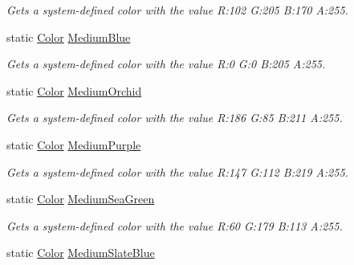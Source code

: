\begin{DoxyCompactItemize}
\begin{DoxyCompactList}\small\item\em Gets a system-\/defined color with the value R\+:102 G\+:205 B\+:170 A\+:255.\end{DoxyCompactList}\item 
static \hyperlink{structMicrosoft_1_1Xna_1_1Framework_1_1Color}{Color} \hyperlink{structMicrosoft_1_1Xna_1_1Framework_1_1Color_af1d6d462b2b790c1db7fa4eea1c2192e}{Medium\+Blue}
\begin{DoxyCompactList}\small\item\em Gets a system-\/defined color with the value R\+:0 G\+:0 B\+:205 A\+:255.\end{DoxyCompactList}\item 
static \hyperlink{structMicrosoft_1_1Xna_1_1Framework_1_1Color}{Color} \hyperlink{structMicrosoft_1_1Xna_1_1Framework_1_1Color_a8988833e0d78a5f1c388744b435bfa93}{Medium\+Orchid}
\begin{DoxyCompactList}\small\item\em Gets a system-\/defined color with the value R\+:186 G\+:85 B\+:211 A\+:255.\end{DoxyCompactList}\item 
static \hyperlink{structMicrosoft_1_1Xna_1_1Framework_1_1Color}{Color} \hyperlink{structMicrosoft_1_1Xna_1_1Framework_1_1Color_a284eb3cb1887086dff3503f0055d378b}{Medium\+Purple}
\begin{DoxyCompactList}\small\item\em Gets a system-\/defined color with the value R\+:147 G\+:112 B\+:219 A\+:255.\end{DoxyCompactList}\item 
static \hyperlink{structMicrosoft_1_1Xna_1_1Framework_1_1Color}{Color} \hyperlink{structMicrosoft_1_1Xna_1_1Framework_1_1Color_a8ff4f49c2f2f79dc6f3df8a13b26429d}{Medium\+Sea\+Green}
\begin{DoxyCompactList}\small\item\em Gets a system-\/defined color with the value R\+:60 G\+:179 B\+:113 A\+:255.\end{DoxyCompactList}\item 
static \hyperlink{structMicrosoft_1_1Xna_1_1Framework_1_1Color}{Color} \hyperlink{structMicrosoft_1_1Xna_1_1Framework_1_1Color_ac03d200c812e52a0eac9b8fcfb426040}{Medium\+Slate\+Blue}

\end{DoxyCompactItemize}
